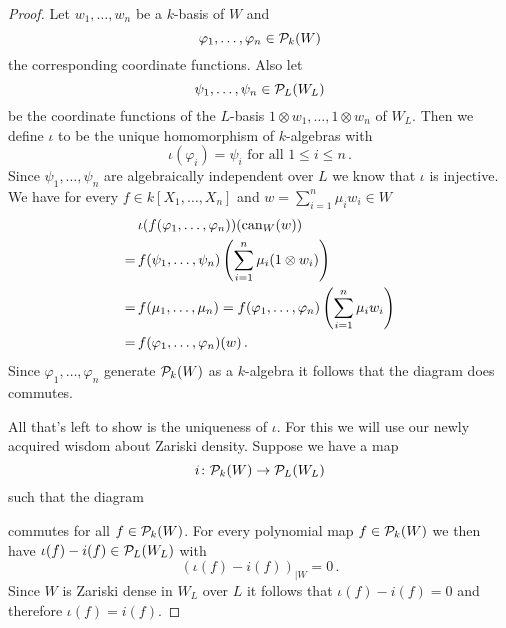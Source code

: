 \begin{proof}
  Let $w_1, \dotsc, w_n$ be a $k$-basis of $W$ and
  \[
        \varphi_1, \dotsc, \varphi_n
    \in \mathcal{P}_k(W)
  \]
  the corresponding coordinate functions. Also let
  \[
        \psi_1, \dotsc, \psi_n
    \in \mathcal{P}_L(W_L)
  \]
  be the coordinate functions of the $L$-basis $1 \otimes w_1, \dotsc, 1 \otimes w_n$ of $W_L$.
  Then we define $\iota$ to be the unique homomorphism of $k$-algebras with
  \[
      \iota(\varphi_i)
    = \psi_i
    \text{ for all }
    1 \leq i \leq n \,.
  \]
  Since $\psi_1, \dotsc, \psi_n$ are algebraically independent over $L$ we know that $\iota$ is injective.
  We have for every $f \in k[X_1, \dotsc, X_n]$ and $w = \sum_{i=1}^n \mu_i w_i \in W$
  \begin{align*}
     &\,  \iota(f(\varphi_1, \dotsc, \varphi_n))(\operatorname{can}_W(w)) \\
    =&\,  f(\psi_1, \dotsc, \psi_n)\left( \sum_{i=1}^n \mu_i (1 \otimes w_i) \right) \\
    =&\,  f(\mu_1, \dotsc, \mu_n)
     =    f(\varphi_1, \dotsc, \varphi_n)\left( \sum_{i=1}^n \mu_i w_i \right) \\
    =&\,  f(\varphi_1, \dotsc, \varphi_n)(w) \,.
  \end{align*}
  Since $\varphi_1, \dotsc, \varphi_n$ generate $\mathcal{P}_k(W)$ as a $k$-algebra it follows that the diagram does commutes.
  
  All that’s left to show is the uniqueness of $\iota$.
  For this we will use our newly acquired wisdom about Zariski density.
  Suppose we have a map
  \[
            i
    \colon  \mathcal{P}_k(W)
    \to     \mathcal{P}_L(W_L)
  \]
  such that the diagram
    \begin{center}
  \end{center}
  commutes for all $f \in \mathcal{P}_k(W)$.
  For every polynomial map $f \in \mathcal{P}_k(W)$ we then have \mbox{$\iota(f)-i(f) \in \mathcal{P}_L(W_L)$} with
  \[
      \left(
        \iota(f)-i(f)
      \right)_{|W}
    = 0 \,.
  \]
  Since $W$ is Zariski dense in $W_L$ over $L$ it follows that $\iota(f) - i(f) = 0$ and therefore $\iota(f) = i(f)$.
\end{proof}


